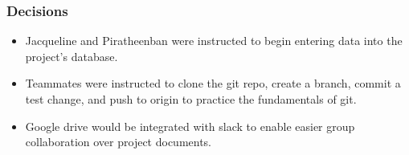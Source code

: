 \documentclass[paper=a4, fontsize=11pt]{scrartcl}
\begin{document}
\subsubsection*{Decisions}
\begin{itemize}
    \item Jacqueline and Piratheenban were instructed to begin entering data into the project's database.
    \item Teammates were instructed to clone the git repo, create a branch, commit a test change, and push to origin to practice the fundamentals of git.
    \item Google drive would be integrated with slack to enable easier group collaboration over project documents.
\end{itemize}

\subsection*{\color{red}{Next Meeting: Friday, January 22 1:00PM}}
\end{document}
